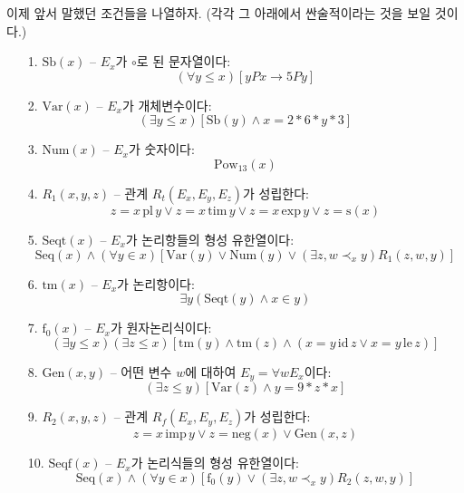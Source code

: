 \documentclass[12pt]{paper}
\begin{document}
이제 앞서 말했던 조건들을 나열하자. (각각 그 아래에서 싼술적이라는 것을 보일 것이다.)
\begin{enumerate}
\item[{1.}] $\mathrm{Sb} \left( x \right)$ -- $E_x$가 $\circ$로 된 문자열이다:
$$ \left( \forall y \le x \right) \left[ y P x \rightarrow 5 P y \right] $$
\item[{2.}] $\mathrm{Var} \left( x \right)$ -- $E_x$가 개체변수이다:
$$ \left( \exists y \le x \right) \left[ \mathrm{Sb} \left( y \right) \land x = 2 * 6 * y * 3 \right] $$
\item[{3.}] $\mathrm{Num} \left( x \right)$ -- $E_x$가 숫자이다:
$$ \mathrm{Pow}_{13}\left( x \right) $$
\item[{4.}] $R_1 \left( x , y , z \right)$ -- 관계 $R_t \left( E_x , E_y , E_z \right)$가 성립한다:
$$ z = x \, \mathrm{pl} \, y \lor z = x \, \mathrm{tim} \, y \lor z = x \, \mathrm{exp} \, y \lor z = \mathrm{s} \left( x \right)$$
\item[{5.}] $\mathrm{Seqt} \left( x \right)$ -- $E_{x}$가 논리항들의 형성 유한열이다:
$$ \mathrm{Seq} \left( x \right) \land \left( \forall y \in x \right) \left[ \mathrm{Var} \left( y \right) \lor \mathrm{Num} \left( y \right) \lor \left( \exists z , w \prec_x y \right) R_1 \left( z , w , y \right) \right] $$
\item[{6.}] $\mathrm{tm} \left( x \right)$ -- $E_{x}$가 논리항이다:
$$ \exists y \left( \mathrm{Seqt} \left( y \right) \land x \in y \right) $$
\item[{7.}] $\mathrm{f}_0 \left( x \right)$ -- $E_{x}$가 원자논리식이다:
$$ \left( \exists y \le x \right) \left( \exists z \le x \right) \left[ \mathrm{tm}\left( y \right) \land \mathrm{tm}\left( z \right) \land \left( x = y \, \mathrm{id} \, z \lor x = y \, \mathrm {le} \, z \right) \right] $$
\item[{8.}] $\mathrm{Gen} \left( x , y \right)$ -- 어떤 변수 $w$에 대하여 $E_y = \forall w E_x $이다:
$$ \left( \exists z \le y \right) \left[ \mathrm{Var} \left( z \right) \land y = 9 * z * x \right] $$
\item[{9.}] $R_2 \left( x , y , z \right)$ -- 관계 $R_f \left( E_x , E_y , E_z \right)$가 성립한다:
$$ z = x \, \mathrm{imp} \, y \lor z = \mathrm{neg} \left( x \right) \lor \mathrm{Gen} \left( x , z \right) $$
\item[{10.}] $\mathrm{Seqf} \left( x \right)$ -- $E_x$가 논리식들의 형성 유한열이다:
$$ \mathrm{Seq} \left( x \right) \land \left( \forall y \in x \right) \left[ \mathrm{f}_0 \left( y \right) \lor \left( \exists z , w \prec_x y \right) R_2 \left( z , w , y \right) \right]$$

\end{enumerate}
\end{document}

